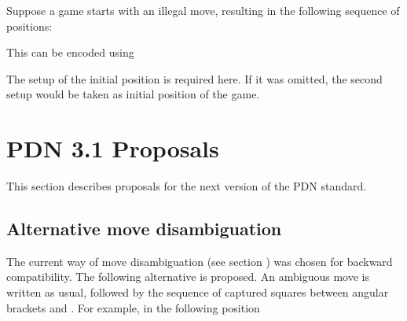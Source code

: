 \documentclass[letterpaper,10pt,english]{sphinxmanual}
\begin{document}
\sphinxAtStartPar
Suppose a game starts with an illegal move, resulting in the following sequence
of positions:
\begin{quote}

\noindent{}

\noindent{}

\noindent{}
\end{quote}

\sphinxAtStartPar
This can be encoded using

\begin{sphinxVerbatim}[commandchars=\\\{\}]
 
 
 
\end{sphinxVerbatim}

\sphinxAtStartPar
The setup of the initial position is required here. If it was
omitted, the second setup would be taken as initial position of the game.

\sphinxstepscope


\chapter{PDN 3.1 Proposals}
\label{\detokenize{pdnnext:pdn-3-1-proposals}}\label{\detokenize{pdnnext::doc}}
\sphinxAtStartPar
This section describes proposals for the next version of the PDN standard.


\section{Alternative move disambiguation}
\label{\detokenize{pdnnext:alternative-move-disambiguation}}
\sphinxAtStartPar
The current way of move disambiguation (see section {\hyperref[\detokenize{grammar:grammar-section}]{}}) was chosen for backward compatibility.
The following alternative is proposed. An ambiguous move is written as usual, followed by the sequence of
captured squares between angular brackets \sphinxcode{\sphinxupquote{\textless{}}} and \sphinxcode{\sphinxupquote{\textgreater{}}}. For example, in the following position
\begin{quote}

\noindent{}
\end{quote}
\end{document}
